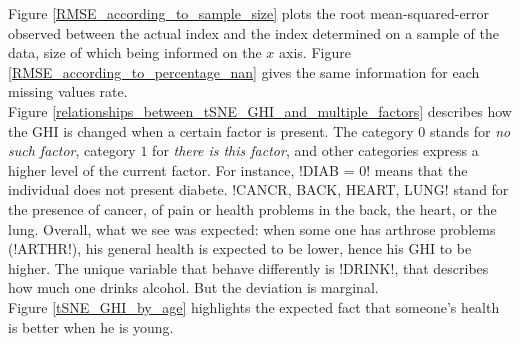\documentclass[]{article}
\begin{document}
Figure \ref{RMSE_according_to_sample_size} plots the root mean-squared-error observed between the actual index and the index determined on a sample of the data, size of which being informed on the $x$ axis. Figure \ref{RMSE_according_to_percentage_nan} gives the same information for each missing values rate.\\

Figure \ref{relationships_between_tSNE_GHI_and_multiple_factors} describes how the GHI is changed when a certain factor is present. The category $0$ stands for \textit{no such factor}, category $1$ for \textit{there is this factor}, and other categories express a higher level of the current factor. For instance, \pyth!DIAB = 0! means that the individual does not present diabete. \pyth!CANCR, BACK, HEART, LUNG! stand for the presence of cancer, of pain or health problems in the back, the heart, or the lung. Overall, what we see was expected: when some one has arthrose problems (\pyth!ARTHR!), his general health is expected to be lower, hence his GHI to be higher. The unique variable that behave differently is \pyth!DRINK!, that describes how much one drinks alcohol. But the deviation is marginal.\\

Figure \ref{tSNE_GHI_by_age} highlights the expected fact that someone's health is better when he is young.





\newpage


\end{document}
